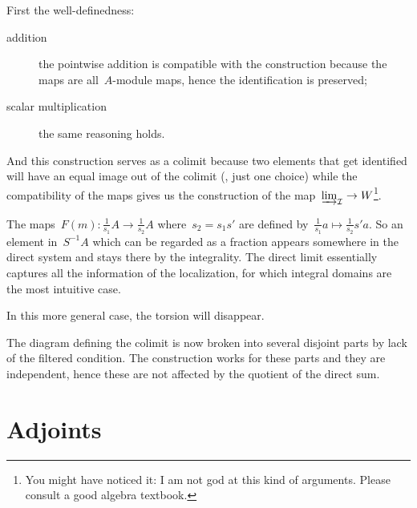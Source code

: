\begin{exercise}
  First the well-definedness:
  \begin{description}
    \item[addition] the pointwise addition is compatible with the construction because the maps are all~$A$\nobreakdash-module maps, hence the identification is preserved;
    \item[scalar multiplication] the same reasoning holds.
  \end{description}

  And this construction serves as a colimit because two elements that get identified will have an equal image out of the colimit (\ie, just one choice) while the compatibility of the maps gives us the construction of the map~$\varinjlim_{\mathcal{I}}\to W$\footnote{You might have noticed it: I am not god at this kind of arguments. Please consult a good algebra textbook.}.
\end{exercise}

\begin{exercise}
  The maps~$F(m)\colon\frac{1}{s_1}A\to\frac{1}{s_2}A$ where~$s_2=s_1s'$ are defined by~$\frac{1}{s_1}a\mapsto\frac{1}{s_2}s'a$. So an element in~$S^{-1}A$ which can be regarded as a fraction appears somewhere in the direct system and stays there by the integrality. The direct limit essentially captures all the information of the localization, for which integral domains are the most intuitive case.

  In this more general case, the torsion will disappear.
\end{exercise}

\begin{exercise}
  The diagram defining the colimit is now broken into several disjoint parts by lack of the filtered condition. The construction works for these parts and they are independent, hence these are not affected by the quotient of the direct sum.
\end{exercise}


\section{Adjoints}

